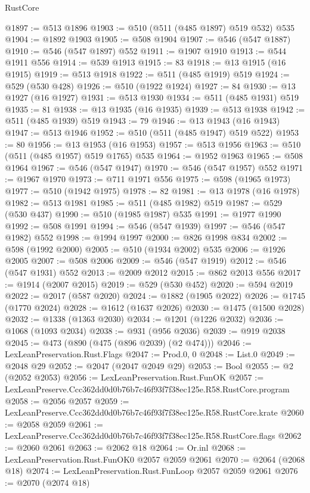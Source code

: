 \begin{lexlean}{RustCore}
\begin{coremodule}
@1897 := @513 @1896
@1903 := @510 (@511 (@485 @1897) @519 @532) @535
@1904 := @1892 @1903
@1905 := @508 @1904
@1907 := @546 (@547 @1887)
@1910 := @546 (@547 @1897) @552
@1911 := @1907 @1910
@1913 := @544 @1911 @556
@1914 := @539 @1913
@1915 := 83
@1918 := @13 @1915 (@16 @1915)
@1919 := @513 @1918
@1922 := @511 (@485 @1919) @519
@1924 := @529 (@530 @428)
@1926 := @510 (@1922 @1924)
@1927 := 84
@1930 := @13 @1927 (@16 @1927)
@1931 := @513 @1930
@1934 := @511 (@485 @1931) @519
@1935 := 81
@1938 := @13 @1935 (@16 @1935)
@1939 := @513 @1938
@1942 := @511 (@485 @1939) @519
@1943 := 79
@1946 := @13 @1943 (@16 @1943)
@1947 := @513 @1946
@1952 := @510 (@511 (@485 @1947) @519 @522)
@1953 := 80
@1956 := @13 @1953 (@16 @1953)
@1957 := @513 @1956
@1963 := @510 (@511 (@485 @1957) @519 @1765) @535
@1964 := @1952 @1963
@1965 := @508 @1964
@1967 := @546 (@547 @1947)
@1970 := @546 (@547 @1957) @552
@1971 := @1967 @1970
@1973 := @711 @1971 @556
@1975 := @598 (@1965 @1973)
@1977 := @510 (@1942 @1975)
@1978 := 82
@1981 := @13 @1978 (@16 @1978)
@1982 := @513 @1981
@1985 := @511 (@485 @1982) @519
@1987 := @529 (@530 @437)
@1990 := @510 (@1985 @1987) @535
@1991 := @1977 @1990
@1992 := @508 @1991
@1994 := @546 (@547 @1939)
@1997 := @546 (@547 @1982) @552
@1998 := @1994 @1997
@2000 := @826 @1998 @834
@2002 := @598 (@1992 @2000)
@2005 := @510 (@1934 @2002) @535
@2006 := @1926 @2005
@2007 := @508 @2006
@2009 := @546 (@547 @1919)
@2012 := @546 (@547 @1931) @552
@2013 := @2009 @2012
@2015 := @862 @2013 @556
@2017 := @1914 (@2007 @2015)
@2019 := @529 (@530 @452)
@2020 := @594 @2019
@2022 := @2017 (@587 @2020)
@2024 := @1882 (@1905 @2022)
@2026 := @1745 (@1770 @2024)
@2028 := @1612 (@1637 @2026)
@2030 := @1475 (@1500 @2028)
@2032 := @1338 (@1363 @2030)
@2034 := @1201 (@1226 @2032)
@2036 := @1068 (@1093 @2034)
@2038 := @931 (@956 @2036)
@2039 := @919 @2038
@2045 := @473 (@890 (@475 (@896 @2039) (@2 @474)))
@2046 := LexLeanPreservation.Rust.Flags
@2047 := Prod.{0, 0}
@2048 := List.{0}
@2049 := @2048 @29
@2052 := @2047 (@2047 @2049 @29)
@2053 := Bool
@2055 := @2 (@2052 @2053)
@2056 := LexLeanPreservation.Rust.FunOK
@2057 := LexLeanPreserve.Ccc362dd0d0b76b7c46f93f7f38ec125e.R58.RustCore.program
@2058 := @2056 @2057
@2059 := LexLeanPreserve.Ccc362dd0d0b76b7c46f93f7f38ec125e.R58.RustCore.krate
@2060 := @2058 @2059
@2061 := LexLeanPreserve.Ccc362dd0d0b76b7c46f93f7f38ec125e.R58.RustCore.flags
@2062 := @2060 @2061
@2063 := @2062 @18
@2064 := Or.inl
@2068 := LexLeanPreservation.Rust.FunOK0 @2057 @2059 @2061
@2070 := @2064 (@2068 @18)
@2074 := LexLeanPreservation.Rust.FunLoop @2057 @2059 @2061
@2076 := @2070 (@2074 @18)

\end{coremodule}
\end{lexlean}
